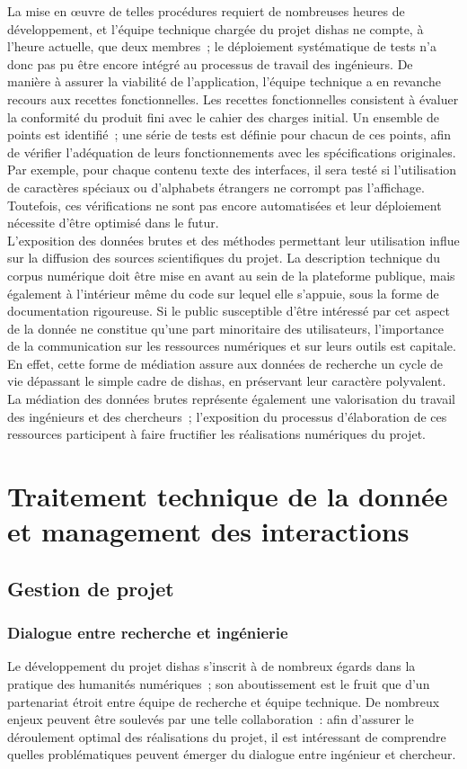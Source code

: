 \documentclass[a4paper,12pt,twoside]{book}
\newcommand{\clearemptydoublepage}{\newpage{\pagestyle{empty}\cleardoublepage}}
\newcommand{\dishas}{\gls{dishas}\xspace}
\begin{document}
La mise en œuvre de telles procédures requiert de nombreuses heures de développement, et l'équipe technique chargée du projet \dishas ne compte, à l'heure actuelle, que deux membres~; le déploiement systématique de tests n'a donc pas pu  être encore intégré au processus de travail des ingénieurs. De manière à assurer la viabilité de l'application, l'équipe technique a en revanche recours aux recettes fonctionnelles. Les recettes fonctionnelles consistent à évaluer la conformité du produit fini avec le cahier des charges initial. Un ensemble de points est identifié~; une série de tests est définie pour chacun de ces points, afin de vérifier l'adéquation de leurs fonctionnements avec les spécifications originales. Par exemple, pour chaque contenu texte des interfaces, il sera testé si l'utilisation de caractères spéciaux ou d'alphabets étrangers ne corrompt pas l'affichage. Toutefois, ces vérifications ne sont pas encore automatisées et leur déploiement nécessite d'être optimisé dans le futur.\\

L'exposition des données brutes et des méthodes permettant leur utilisation influe sur la diffusion des sources scientifiques du projet. La description technique du corpus numérique doit être mise en avant au sein de la plateforme publique, mais également à l'intérieur même du code sur lequel elle s'appuie, sous la forme de documentation rigoureuse. Si le public susceptible d'être intéressé par cet aspect de la donnée ne constitue qu'une part minoritaire des utilisateurs, l'importance de la communication sur les ressources numériques et sur leurs outils est capitale. En effet, cette forme de médiation assure aux données de recherche un cycle de vie dépassant le simple cadre de \dishas, en préservant leur caractère polyvalent. La médiation des données brutes représente également une valorisation du travail des ingénieurs et des chercheurs~; l'exposition du processus d'élaboration de ces ressources participent à faire fructifier les réalisations numériques du projet.

\clearemptydoublepage

\part{Traitement technique de la donnée et management des interactions}
\chapter{Gestion de projet}
	\section{Dialogue entre recherche et ingénierie}
Le développement du projet \dishas s'inscrit à de nombreux égards dans la pratique des humanités numériques~; son aboutissement est le fruit que d'un partenariat étroit entre équipe de recherche et équipe technique. De nombreux enjeux peuvent être soulevés par une telle collaboration~: afin d'assurer le déroulement optimal des réalisations du projet, il est intéressant de comprendre quelles problématiques peuvent émerger du dialogue entre ingénieur et chercheur.
\end{document}
